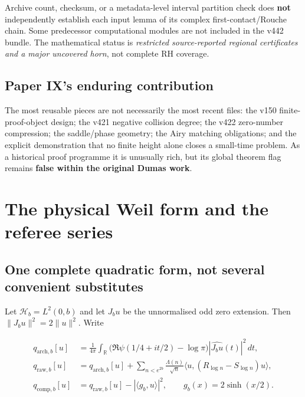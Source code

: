 \documentclass[
  10pt,
  a4paper,
  10pt,
  oneside,
  openany]{book}
\begin{document}
Archive count, checksum, or a metadata-level interval partition check
does \textbf{not} independently establish each input lemma of its
complex first-contact/Rouch\textquotesingle e chain. Some predecessor
computational modules are not included in the v442 bundle. The
mathematical status is \emph{restricted source-reported regional
certificates and a major uncovered horn}, not complete RH coverage.

\subsection{Paper IX's enduring
contribution}\label{paper-ixs-enduring-contribution}

The most reusable pieces are not necessarily the most recent files: the
v150 finite-proof-object design; the v421 negative collision degree; the
v422 zero-number compression; the saddle/phase geometry; the Airy
matching obligations; and the explicit demonstration that no finite
height alone closes a small-time problem. As a historical proof
programme it is unusually rich, but its global theorem flag remains
\textbf{false within the original Dumas work}.

\section{The physical Weil form and the referee
series}\label{the-physical-weil-form-and-the-referee-series}

\subsection{One complete quadratic form, not several convenient
substitutes}\label{one-complete-quadratic-form-not-several-convenient-substitutes}

Let \(\mathcal H_b=L^2(0,b)\) and let \(J_bu\) be the unnormalised odd
zero extension. Then \(\|J_bu\|^2=2\|u\|^2\). Write

\[
\begin{split}
q_{\mathrm{arch},b}[u]
&=\frac1{4\pi}\int_{\mathbb R}
\bigl(\Re\psi(1/4+it/2)-\log\pi\bigr)|\widehat{J_bu}(t)|^2\,dt,\\
q_{\mathrm{raw},b}[u]
&=q_{\mathrm{arch},b}[u]
+\sum_{n<e^{2b}}\frac{\Lambda(n)}{\sqrt n}
\langle u,(R_{\log n}-S_{\log n})u\rangle,\\
q_{\mathrm{comp},b}[u]
&=q_{\mathrm{raw},b}[u]-|\langle g_b,u\rangle|^2,
\qquad g_b(x)=2\sinh(x/2).
\end{split}
\tag{S5.1}\label{eq:S5.1}
\]
\end{document}
